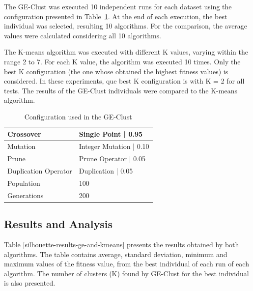\documentclass[conference]{IEEEtran}
\begin{document}
	
	The GE-Clust was executed 10 independent runs for each dataset using the configuration presented in Table~\ref{ge-configuration}. At the end of each execution, the best individual was selected, resulting 10 algorithms. For the comparison, the average values were calculated considering all 10 algorithms.
	
	
	The K-means algorithm was executed with different K values, varying within the range 2 to 7. For each K value, the algorithm was executed 10 times. Only the best K configuration (the one whose obtained the highest fitness values) is considered. In these experiments, que best K configuration is with K = 2 for all tests. The results of the GE-Clust individuals were compared to the K-means algorithm.
	
	
	\begin{table}[]
		\centering
		\caption{Configuration used in the GE-Clust}
		\label{ge-configuration}
		\begin{tabular}{|l|l|}
			\hline
			{Crossover }           & Single Point  | 0.95     \\ \hline
			{Mutation }            & Integer Mutation   |  0.10 \\ \hline
			{Prune  }              & Prune Operator | 0.05   \\ \hline
			{Duplication Operator } & Duplication   | 0.05     \\ \hline
			{Population}                        & 100                               \\ \hline
			{Generations}                       & 200                               \\ \hline
		\end{tabular}
	\end{table}

	
	\subsection{Results and Analysis}
	
	
	Table \ref{silhouette-results-ge-and-kmeans} presents the results obtained by both algorithms. The table contains average, standard deviation, minimum and maximum values of the fitness value, from the best individual of each run of each algorithm. The number of clusters (K) found by GE-Clust for the best individual is also presented.
	
\end{document}
